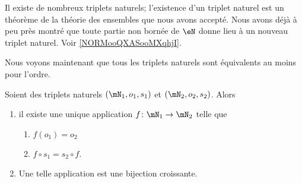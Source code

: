 Il existe de nombreux triplets naturels; l'existence d'un triplet naturel est un théorème de la théorie des ensembles que nous avons accepté. Nous avons déjà à peu près montré que toute partie non bornée de \( \eN\) donne lieu à un nouveau triplet naturel. Voir \ref{NORMooQXASooMXqhjI}.

Nous voyons maintenant que tous les triplets naturels sont équivalents au moins pour l'ordre.

\begin{theorem}     \label{THOooFUXMooJuigHK}
	Soient des triplets naturels \( (\mN_1,o_1,s_1)\) et \( (\mN_2,o_2,s_2)\). Alors
	\begin{enumerate}
		\item
		      il existe une unique application \( f\colon \mN_1\to \mN_2\) telle que
		      \begin{enumerate}
			      \item
			            \( f(o_1)=o_2\)
			      \item
			            \( f\circ s_1=s_2\circ f\).
		      \end{enumerate}
		\item
		      Une telle application est une bijection croissante.
	\end{enumerate}
\end{theorem}

